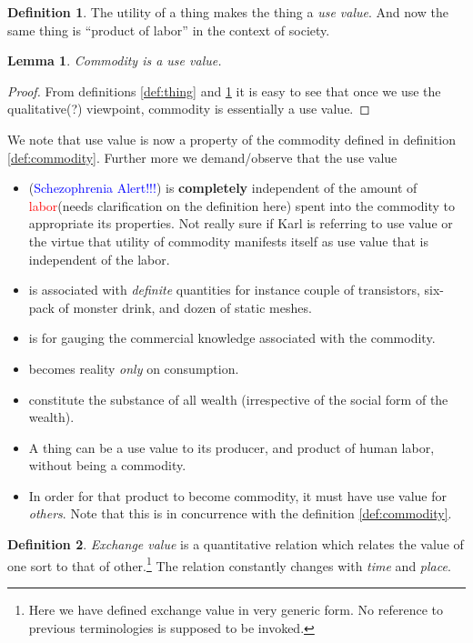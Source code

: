 \documentclass[12pt]{extarticle}
\newtheorem{lemma}[theorem]{Lemma}
\theoremstyle{definition}
\newtheorem{definition}{Definition}[section]
\newenvironment{remark}[1][Remark]{\begin{trivlist}
\item[\hskip \labelsep {\bfseries #1}]}{\end{trivlist}}
\begin{document}
\begin{definition}
  \label{def:usevalue}
  The utility of a thing makes the thing a \emph{use value}.  And now the same thing is ``product of labor'' in the context of society.
  \end{definition}

  \begin{lemma}
    Commodity is a use value.
    \end{lemma}
  \begin{proof}
    From definitions \ref{def:thing} and \ref{def:usevalue} it is easy to see that once we use the qualitative(?) viewpoint, commodity is essentially a use value.
  \end{proof}
  \begin{remark}
    We note that use value is now a property of the commodity defined in definition \ref{def:commodity}.  Further more we demand/observe that the use value
    \begin{itemize}
    \item (\textcolor{blue}{Schezophrenia Alert!!!}) is \textbf{completely} independent of the amount of \textcolor{red}{labor}(needs clarification on the definition here) spent into the commodity to appropriate its properties.  Not really sure if Karl is referring to use value or the virtue that utility of commodity manifests itself as use value that is independent of the labor.
    \item  is associated with \emph{definite} quantities for instance couple of transistors, six-pack of monster drink, and dozen of static meshes.
    \item is for gauging the commercial knowledge associated with the commodity.
    \item becomes reality \emph{only} on consumption.
    \item constitute the substance of all wealth (irrespective of the social form of the wealth).
    \item A thing can be a use value to its producer, and product of human labor, without being a commodity.
      \item In order for that product to become commodity, it must have use value for \emph{others}.  Note that this is in concurrence with the definition \ref{def:commodity}.
    \end{itemize}
  \end{remark}

  \begin{definition}
    \label{def:exchval}
    \emph{Exchange value} is a quantitative relation which relates the value of one sort to that of other.\footnote{Here we have defined exchange value in very generic form.  No reference to previous terminologies is supposed to be invoked.}  The relation constantly changes with \emph{time} and \emph{place}.
  \end{definition}
\end{document}
